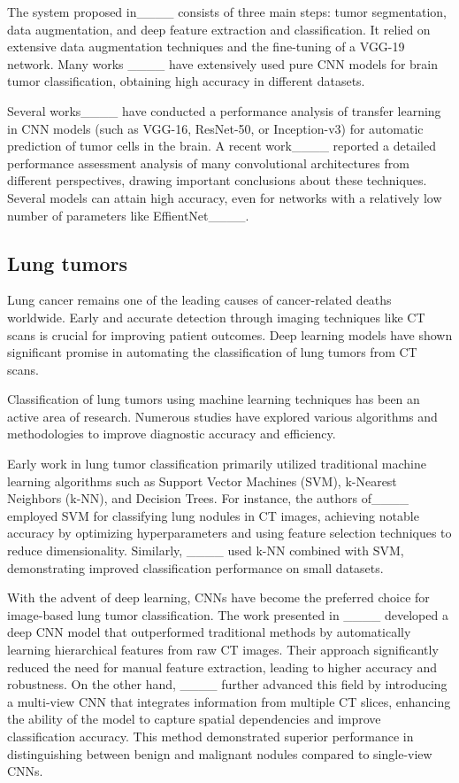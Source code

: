 The system proposed in____ consists of three main steps: tumor segmentation, data augmentation, and deep feature extraction and classification. It relied on extensive data augmentation techniques and the fine-tuning of a VGG-19 network. Many works ____ have extensively used pure CNN models for brain tumor classification, obtaining high accuracy in different datasets. 

Several works____ have conducted a performance analysis of transfer learning in CNN models (such as VGG-16, ResNet-50, or Inception-v3) for automatic prediction of tumor cells in the brain. A recent work____ reported a detailed performance assessment analysis of many convolutional architectures from different perspectives, drawing important conclusions about these techniques. Several models can attain high accuracy, even for networks with a relatively low number of parameters like EffientNet____. 

\subsection{Lung tumors}
    
Lung cancer remains one of the leading causes of cancer-related deaths worldwide. Early and accurate detection through imaging techniques like CT scans is crucial for improving patient outcomes. Deep learning models have shown significant promise in automating the classification of lung tumors from CT scans. 

Classification of lung tumors using machine learning techniques has been an active area of research. Numerous studies have explored various algorithms and methodologies to improve diagnostic accuracy and efficiency. 

Early work in lung tumor classification primarily utilized traditional machine learning algorithms such as Support Vector Machines (SVM), k-Nearest Neighbors (k-NN), and Decision Trees. For instance, the authors of____ employed SVM for classifying lung nodules in CT images, achieving notable accuracy by optimizing hyperparameters and using feature selection techniques to reduce dimensionality. Similarly, ____ used k-NN combined with SVM, demonstrating improved classification performance on small datasets.

With the advent of deep learning, CNNs have become the preferred choice for image-based lung tumor classification. The work presented in ____ developed a deep CNN model that outperformed traditional methods by automatically learning hierarchical features from raw CT images. Their approach significantly reduced the need for manual feature extraction, leading to higher accuracy and robustness. On the other hand, ____ further advanced this field by introducing a multi-view CNN that integrates information from multiple CT slices, enhancing the ability of the model to capture spatial dependencies and improve classification accuracy. This method demonstrated superior performance in distinguishing between benign and malignant nodules compared to single-view CNNs.

